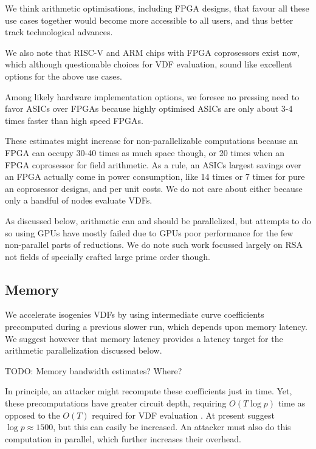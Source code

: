 \documentclass{article}
\begin{document}
We think arithmetic optimisations, including FPGA designs, that favour
all these use cases together would become more accessible to all users,
and thus better track technological advances.

We also note that RISC-V and ARM chips with FPGA coprosessors exist
now, which although questionable choices for VDF evaluation, sound
like excellent options for the above use cases.

Among likely hardware implementation options, 
we foresee no pressing need to favor ASICs over FPGAs because highly
optimised ASICs are only about 3-4 times faster than high speed FPGAs.

These estimates might increase for non-parallelizable computations
because an FPGA can occupy 30-40 times as much space though, or
20 times when an FPGA coprosessor for field arithmetic.
As a rule, an ASICs largest savings over an FPGA actually come in
power consumption, like 14 times or 7 times for pure an coprosessor
designs, and per unit costs.  We do not care about either
because only a handful of nodes evaluate VDFs.  

As discussed below, arithmetic can and should be parallelized,
but attempts to do so using GPUs have mostly failed due to GPUs poor
performance for the few non-parallel parts of reductions.  
We do note such work focussed largely on RSA not fields of specially
crafted large prime order though.

\subsection{Memory}

We accelerate isogenies VDFs by using intermediate curve coefficients
precomputed during a previous slower run, which depends upon memory
latency.  We suggest however that memory latency provides a latency
target for the arithmetic parallelization discussed below.

TODO:  Memory bandwidth estimates?  Where?

In principle, an attacker might recompute these coefficients just in
time.  Yet, these precomputations have greater circuit depth, requiring
$O(T \log p)$ time as opposed to the $O(T)$ required for VDF evaluation
\cite[pp. 21]{IsogeniesVDF}.  At present \cite[pp. 15]{IsogeniesVDF} 
suggest $\log p \approx 1500$, but this can easily be increased.
An attacker must also do this computation in parallel, which further
increases their overhead.
\end{document}
